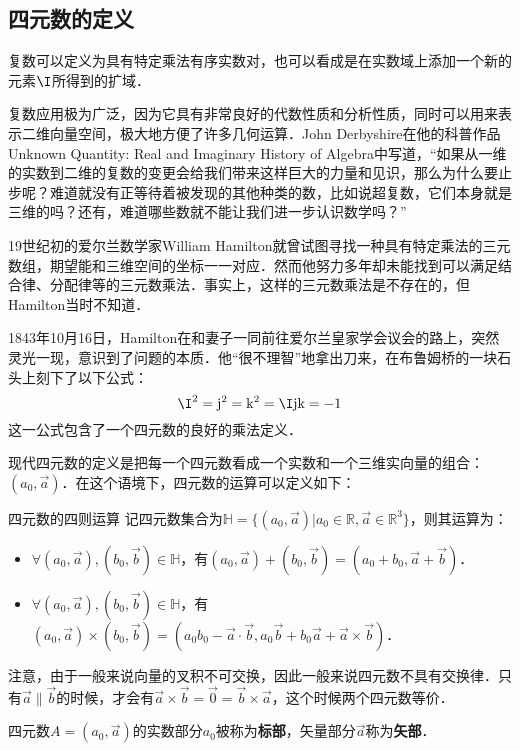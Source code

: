 

\subsection{四元数的定义}

复数可以定义为具有特定乘法有序实数对，也可以看成是在实数域上添加一个新的元素$\I$所得到的扩域．

复数应用极为广泛，因为它具有非常良好的代数性质和分析性质，同时可以用来表示二维向量空间，极大地方便了许多几何运算．John Derbyshire在他的科普作品Unknown Quantity: Real and Imaginary History of Algebra中写道，“如果从一维的实数到二维的复数的变更会给我们带来这样巨大的力量和见识，那么为什么要止步呢？难道就没有正等待着被发现的其他种类的数，比如说超复数，它们本身就是三维的吗？还有，难道哪些数就不能让我们进一步认识数学吗？”

19世纪初的爱尔兰数学家William Hamilton就曾试图寻找一种具有特定乘法的三元数组，期望能和三维空间的坐标一一对应．然而他努力多年却未能找到可以满足结合律、分配律等的三元数乘法．事实上，这样的三元数乘法是不存在的，但Hamilton当时不知道．

1843年10月16日，Hamilton在和妻子一同前往爱尔兰皇家学会议会的路上，突然灵光一现，意识到了问题的本质．他“很不理智”地拿出刀来，在布鲁姆桥的一块石头上刻下了以下公式：$$\I^2=\mathrm{j}^2=\mathrm{k}^2=\I\mathrm{j}\mathrm{k}=-1$$这一公式包含了一个四元数的良好的乘法定义．

现代四元数的定义是把每一个四元数看成一个实数和一个三维实向量的组合：$(a_0, \vec{a})$．在这个语境下，四元数的运算可以定义如下：

\begin{definition}{四元数的四则运算}
记四元数集合为$\mathbb{H}=\{(a_0, \vec{a})|a_0\in\mathbb{R}, \vec{a}\in\mathbb{R}^3\}$，则其运算为：
\begin{itemize}
\item $\forall(a_0, \vec{a}), (b_0, \vec{b})\in\mathbb{H}$，有$(a_0, \vec{a})+ (b_0, \vec{b})=(a_0+b_0, \vec{a}+\vec{b})$．
\item $\forall(a_0, \vec{a}), (b_0, \vec{b})\in\mathbb{H}$，有$(a_0, \vec{a})\times (b_0, \vec{b})=(a_0b_0-\vec{a}\cdot\vec{b}, a_0\vec{b}+b_0\vec{a}+\vec{a}\times\vec{b})$．

\end{itemize}

\end{definition}

注意，由于一般来说向量的叉积不可交换，因此一般来说四元数不具有交换律．只有$\vec{a}\parallel\vec{b}$的时候，才会有$\vec{a}\times\vec{b}=\vec{0}=\vec{b}\times\vec{a}$，这个时候两个四元数等价．

四元数$A=(a_0, \vec{a})$的实数部分$a_0$被称为\textbf{标部}，矢量部分$\vec{a}$称为\textbf{矢部}．
